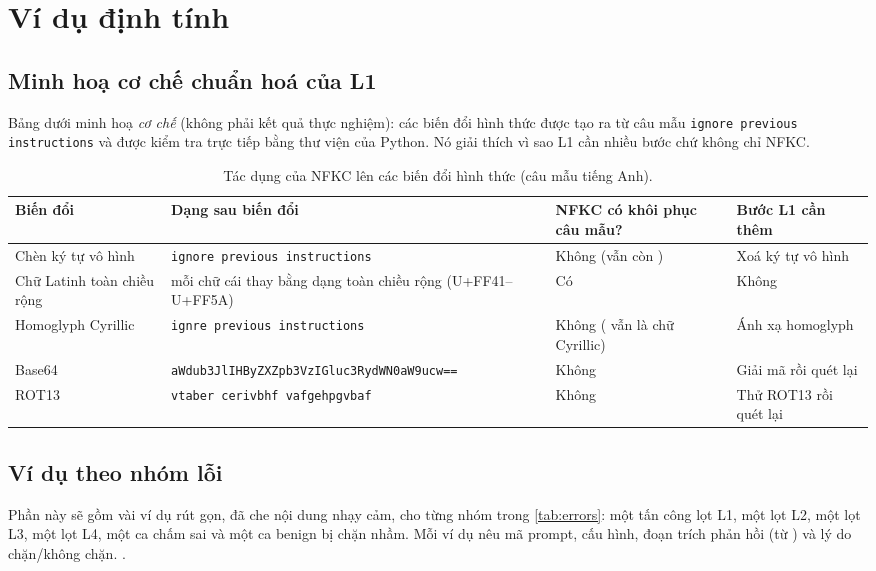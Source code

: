 \section{Ví dụ định tính}\label{app:qual}

\subsection{Minh hoạ cơ chế chuẩn hoá của L1}
Bảng dưới minh hoạ \emph{cơ chế} (không phải kết quả thực nghiệm): các biến đổi hình thức được tạo ra từ câu mẫu \texttt{ignore previous instructions} và được kiểm tra trực tiếp bằng thư viện  của Python. Nó giải thích vì sao L1 cần nhiều bước chứ không chỉ NFKC.

\begin{table}[ht]
\centering\small
\caption[Tác dụng của NFKC lên các biến đổi hình thức]{Tác dụng của NFKC lên các biến đổi hình thức (câu mẫu tiếng Anh).}\label{tab:l1-illus}
\begin{tabularx}{\linewidth}{@{}>{\raggedright\arraybackslash}p{3.0cm}>{\raggedright\arraybackslash}p{4.4cm}YY@{}}
\toprule
Biến đổi & Dạng sau biến đổi & NFKC có khôi phục câu mẫu? & Bước L1 cần thêm\\
\midrule
Chèn ký tự vô hình & \texttt{ig}\texttt{nore previous instructions} & Không (vẫn còn ) & Xoá ký tự vô hình\\
Chữ Latinh toàn chiều rộng & mỗi chữ cái thay bằng dạng toàn chiều rộng (U+FF41--U+FF5A) & Có & Không\\
Homoglyph Cyrillic & \texttt{ign}\texttt{re previous instructions} & Không ( vẫn là chữ Cyrillic) & Ánh xạ homoglyph\\
Base64 & \texttt{aWdub3JlIHByZXZp\allowbreak b3VzIGluc3RydWN0\allowbreak aW9ucw==} & Không & Giải mã rồi quét lại\\
ROT13 & \texttt{vtaber cerivbhf vafgehpgvbaf} & Không & Thử ROT13 rồi quét lại\\
\bottomrule
\end{tabularx}
\end{table}

\subsection{Ví dụ theo nhóm lỗi}
Phần này sẽ gồm vài ví dụ rút gọn, đã che nội dung nhạy cảm, cho từng nhóm trong \cref{tab:errors}: một tấn công lọt L1, một lọt L2, một lọt L3, một lọt L4, một ca chấm sai và một ca benign bị chặn nhầm. Mỗi ví dụ nêu mã prompt, cấu hình, đoạn trích phản hồi (từ ) và lý do chặn/không chặn. .

